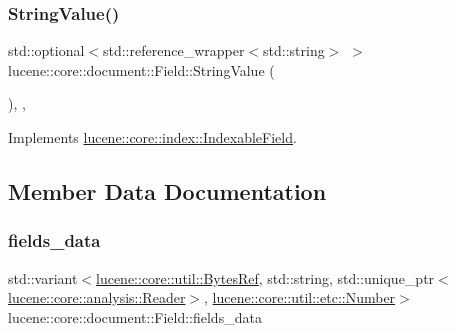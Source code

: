 \mbox{\label{classlucene_1_1core_1_1document_1_1Field_a9eaf712354f0a787e45d4f41b17aeae8}} 
\subsubsection{\texorpdfstring{String\+Value()}{StringValue()}}
{\footnotesize\ttfamily std\+::optional$<$std\+::reference\+\_\+wrapper$<$std\+::string$>$ $>$ lucene\+::core\+::document\+::\+Field\+::\+String\+Value (\begin{DoxyParamCaption}{ }\end{DoxyParamCaption})\hspace{0.3cm}{\ttfamily [inline]}, {\ttfamily [virtual]}, {\ttfamily [noexcept]}}



Implements \mbox{\hyperlink{classlucene_1_1core_1_1index_1_1IndexableField_ac06f4371ff3011ab247a07e219f43223}{lucene\+::core\+::index\+::\+Indexable\+Field}}.



\subsection{Member Data Documentation}
\mbox{\label{classlucene_1_1core_1_1document_1_1Field_a745c27d038375a7fd986488a88b44443}} 
\subsubsection{\texorpdfstring{fields\+\_\+data}{fields\_data}}
{\footnotesize\ttfamily std\+::variant$<$\mbox{\hyperlink{classlucene_1_1core_1_1util_1_1BytesRef}{lucene\+::core\+::util\+::\+Bytes\+Ref}}, std\+::string, std\+::unique\+\_\+ptr$<$\mbox{\hyperlink{classlucene_1_1core_1_1analysis_1_1Reader}{lucene\+::core\+::analysis\+::\+Reader}}$>$, \mbox{\hyperlink{classlucene_1_1core_1_1util_1_1etc_1_1Number}{lucene\+::core\+::util\+::etc\+::\+Number}}$>$ lucene\+::core\+::document\+::\+Field\+::fields\+\_\+data\hspace{0.3cm}{\ttfamily [private]}}


